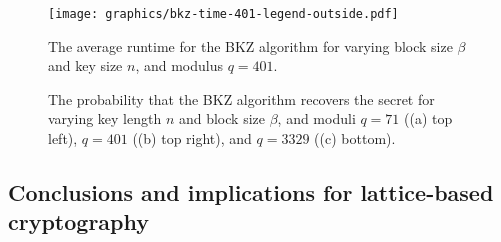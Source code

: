 
\begin{figure}[htbp]
\texttt{[image: graphics/bkz-time-401-legend-outside.pdf]}
\caption{The average runtime for the BKZ algorithm for varying block size $\beta$ and key size $n$, and modulus $q=401$.}
\label{fig:bkz_runtime}
\end{figure}

\begin{figure*}[htbp]
\centering
{}


\caption{The probability that the BKZ algorithm recovers the secret for varying key length $n$ and block size $\beta$, and moduli $q=71$ ((a) top left), $q=401$ ((b) top right), and $q=3329$ ((c) bottom).}
\label{fig:bkz}

\end{figure*}


\subsection{Conclusions and implications for lattice-based cryptography}


